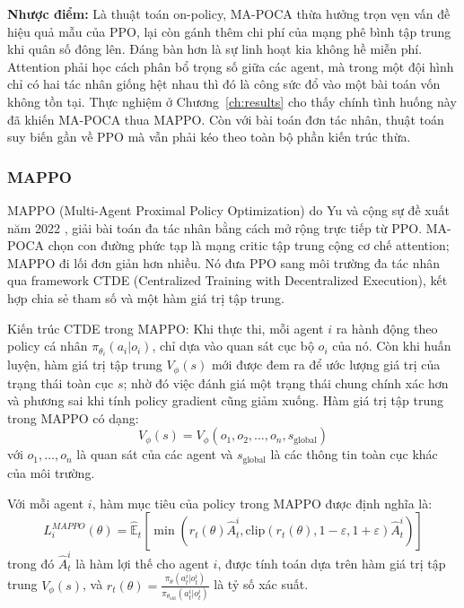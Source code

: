 \indent \textbf{Nhược điểm:} Là thuật toán on-policy, MA-POCA thừa hưởng trọn vẹn vấn đề
hiệu quả mẫu của PPO, lại còn gánh thêm chi phí của mạng phê bình tập trung khi quân số
đông lên. Đáng bàn hơn là sự linh hoạt kia không hề miễn phí. Attention phải học cách phân
bổ trọng số giữa các agent, mà trong một đội hình chỉ có hai tác nhân giống hệt nhau thì
đó là công sức đổ vào một bài toán vốn không tồn tại. Thực nghiệm ở
Chương~\ref{ch:results} cho thấy chính tình huống này đã khiến MA-POCA thua MAPPO. Còn với
bài toán đơn tác nhân, thuật toán suy biến gần về PPO mà vẫn phải kéo theo toàn bộ phần
kiến trúc thừa.

\subsubsection{MAPPO}
\indent MAPPO (Multi-Agent Proximal Policy Optimization) do Yu và cộng sự đề xuất năm 2022
\cite{yu2022surprising}, giải bài toán đa tác nhân bằng cách mở rộng trực tiếp từ PPO.
MA-POCA chọn con đường phức tạp là mạng critic tập trung cộng cơ chế attention; MAPPO đi
lối đơn giản hơn nhiều. Nó đưa PPO sang môi trường đa tác nhân qua framework CTDE
(Centralized Training with Decentralized Execution), kết hợp chia sẻ tham số và một hàm
giá trị tập trung.

{\sloppy
\indent Kiến trúc CTDE trong MAPPO: Khi thực thi, mỗi agent $i$ ra hành động theo
policy cá nhân $\pi_{\theta_i}(a_i | o_i)$, chỉ dựa vào quan sát cục bộ $o_i$ của nó. Còn
khi huấn luyện, hàm giá trị tập trung $V_\phi(s)$ mới được đem ra
để ước lượng giá trị của trạng thái toàn cục $s$; nhờ đó việc đánh giá một trạng thái
chung chính xác hơn và phương sai khi tính policy gradient cũng giảm xuống. Hàm giá trị
tập trung trong MAPPO có dạng:
$$V_\phi(s) = V_\phi(o_1, o_2, \ldots, o_n, s_{\text{global}})$$
với $o_1, \ldots, o_n$ là quan sát của các agent và $s_{\text{global}}$ là các thông tin toàn cục khác của môi trường.\par}

\indent Với mỗi agent $i$, hàm mục tiêu của policy trong MAPPO được định nghĩa là:
\begin{equation}
L_i^{MAPPO}(\theta) = \hat{\mathbb{E}}_t\left[\min\left(r_t(\theta)\hat{A}_t^i, \text{clip}(r_t(\theta), 1-\varepsilon, 1+\varepsilon)\hat{A}_t^i\right)\right]
\end{equation}
trong đó $\hat{A}_t^i$ là hàm lợi thế cho agent $i$, được tính toán dựa trên hàm giá trị tập trung $V_\phi(s)$, và $r_t(\theta) = \frac{\pi_{\theta}(a_t^i|o_t^i)}{\pi_{\theta_{\text{old}}}(a_t^i|o_t^i)}$ là tỷ số xác suất.


